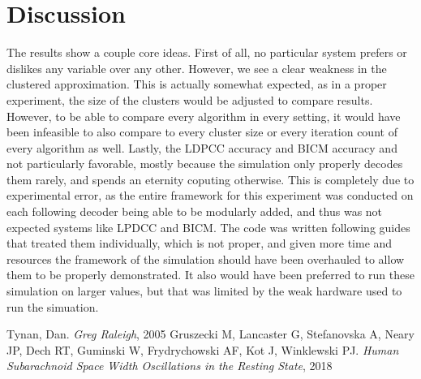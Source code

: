 \documentclass[conference]{IEEEtran}
\begin{document}
\section{Discussion}
The results show a couple core ideas. First of all, no particular system prefers or dislikes any variable over any other. However, we see a clear weakness in the clustered approximation. This is actually somewhat expected, as in a proper experiment, the size of the clusters would be adjusted to compare results. However, to be able to compare every algorithm in every setting, it would have been infeasible to also compare to every cluster size or every iteration count of every algorithm as well. Lastly, the LDPCC accuracy and BICM accuracy and not particularly favorable, mostly because the simulation only properly decodes them rarely, and spends an eternity coputing otherwise. This is completely due to experimental error, as the entire framework for this experiment was conducted on each following decoder being able to be modularly added, and thus was not expected systems like LPDCC and BICM. The code was written following guides that treated them individually, which is not proper, and given more time and resources the framework of the simulation should have been overhauled to allow them to be properly demonstrated. It also would have been preferred to run these simulation on larger values, but that was limited by the weak hardware used to run the simuation.

\begin{thebibliography}{1}
Tynan, Dan. \emph{Greg Raleigh}, 2005
Gruszecki M, Lancaster G, Stefanovska A, Neary JP, Dech RT, Guminski W, Frydrychowski AF, Kot J, Winklewski PJ. \emph{Human Subarachnoid Space Width Oscillations in the Resting State}, 2018
\end{thebibliography}
\end{document}

